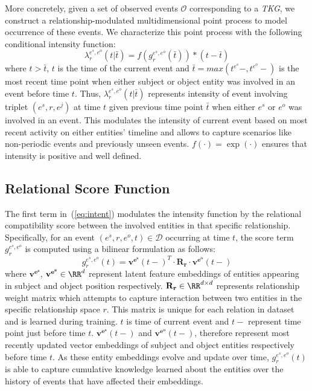 \documentclass{article}
\begin{document}
More concretely, given a set of observed events $\mathcal{O}$ corresponding to a \emph{TKG}, we construct a relationship-modulated  multidimensional point process to model occurrence of these events. We characterize this point process with the following conditional intensity function:  
\begin{equation}
\label{eq:intent}
	\lambda^{e^s,e^o}_r(t|\bar{t}) = f(g^{e^s,e^o}_r(\bar{t})) * (t-\bar{t}) 
\end{equation}
where $t > \bar{t}$, $t$ is the time of the current event and $\bar{t} = max(t^{e^s}-,t^{e^o}-)$ is the most recent time point when either subject or object entity was involved in an event before time $t$. Thus, $\lambda^{e^s,e^o}_r(t|\bar{t})$ represents intensity of event involving triplet $(e^s, r, e^j)$ at time $t$ given previous time point $\bar{t}$ when either $e^s$ or $e^o$ was involved in an event. This modulates the intensity of current event based on most recent activity on either entities' timeline and allows to capture scenarios like non-periodic events and previously unseen events. $f( \cdot ) = \exp( \cdot )$ ensures that intensity is positive and well defined. 

\vspace{-0.2cm}
\subsection{Relational Score Function}
\vspace{-0.1cm}

The first term in~(\ref{eq:intent}) modulates the intensity function by the relational compatibility  score between the involved entities in that specific relationship. Specifically, for an event $(e^s, r, e^o, t) \in \mathcal{D}$  occurring at time $t$, the score term $g^{e^s,e^o}_r$ is computed using a bilinear formulation as follows:
\begin{equation}
\label{eq:sc}
g^{e^s,e^o}_r(t) = \mathbf{v^{e^s}}(t-)^T \cdot \mathbf{R_r} \cdot \mathbf{v^{e^o}}(t-)
\end{equation}
where $\mathbf{v^{e^s}}$, $\mathbf{v^{e^s}} \in \RR^d$ represent latent feature embeddings of entities appearing in subject and object position respectively. $\mathbf{R_r} \in \RR^{d \times d}$ represents relationship weight matrix which attempts to capture interaction between two entities in the specific relationship space $r$. This matrix is unique for each relation in dataset and is learned during training. $t$ is time of current event and $t-$ represent time point just before time $t$. $\mathbf{v^{e^s}}(t-)$ and $\mathbf{v^{e^o}}(t-)$, therefore represent most recently updated vector embeddings of subject and object entities respectively before time $t$. As these entity embeddings evolve and update over time, $g^{e^s,e^o}_r(t)$ is able to capture cumulative knowledge learned about the entities over the history of events that have affected their embeddings. 
\vspace{-0.2cm}
\end{document}
